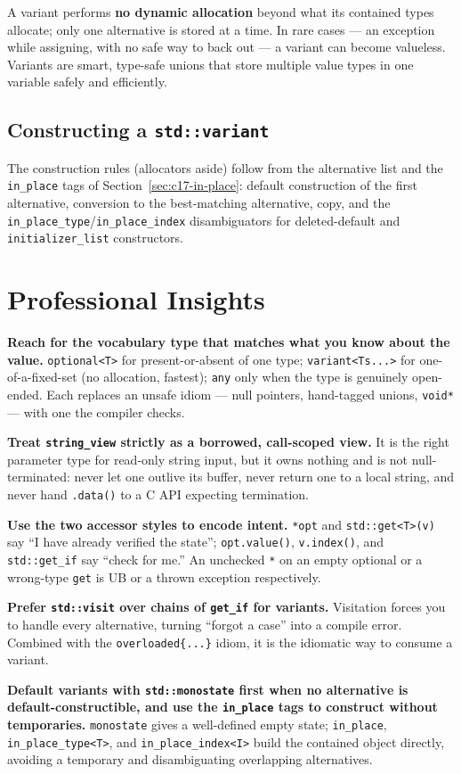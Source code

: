 A variant performs \textbf{no dynamic allocation} beyond what its contained types allocate; only one alternative is stored at a time. In rare cases --- an exception while assigning, with no safe way to back out --- a variant can become valueless. Variants are smart, type-safe unions that store multiple value types in one variable safely and efficiently.

\subsection{Constructing a \texttt{std::variant}}

The construction rules (allocators aside) follow from the alternative list and the \texttt{in\_place} tags of Section~\ref{sec:c17-in-place}: default construction of the first alternative, conversion to the best-matching alternative, copy, and the \texttt{in\_place\_type}/\texttt{in\_place\_index} disambiguators for deleted-default and \texttt{initializer\_list} constructors.

\section{Professional Insights}
\label{sec:c17-vocabulary-insights}

\textbf{Reach for the vocabulary type that matches what you know about the value.} \texttt{optional<T>} for present-or-absent of one type; \texttt{variant<Ts...>} for one-of-a-fixed-set (no allocation, fastest); \texttt{any} only when the type is genuinely open-ended. Each replaces an unsafe idiom --- null pointers, hand-tagged unions, \texttt{void*} --- with one the compiler checks.

\textbf{Treat \texttt{string\_view} strictly as a borrowed, call-scoped view.} It is the right parameter type for read-only string input, but it owns nothing and is not null-terminated: never let one outlive its buffer, never return one to a local string, and never hand \texttt{.data()} to a C API expecting termination.

\textbf{Use the two accessor styles to encode intent.} \texttt{*opt} and \texttt{std::get<T>(v)} say ``I have already verified the state''; \texttt{opt.value()}, \texttt{v.index()}, and \texttt{std::get\_if} say ``check for me.'' An unchecked \texttt{*} on an empty optional or a wrong-type \texttt{get} is UB or a thrown exception respectively.

\textbf{Prefer \texttt{std::visit} over chains of \texttt{get\_if} for variants.} Visitation forces you to handle every alternative, turning ``forgot a case'' into a compile error. Combined with the \texttt{overloaded\{...\}} idiom, it is the idiomatic way to consume a variant.

\textbf{Default variants with \texttt{std::monostate} first when no alternative is default-constructible, and use the \texttt{in\_place} tags to construct without temporaries.} \texttt{monostate} gives a well-defined empty state; \texttt{in\_place}, \texttt{in\_place\_type<T>}, and \texttt{in\_place\_index<I>} build the contained object directly, avoiding a temporary and disambiguating overlapping alternatives.
